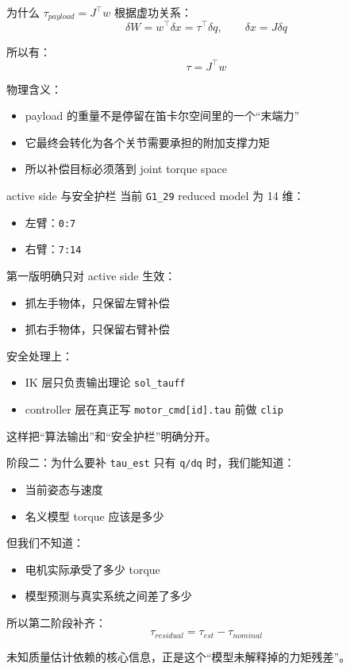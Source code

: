 \documentclass[aspectratio=169,11pt]{ctexbeamer}
\begin{document}
\begin{frame}{为什么 \texorpdfstring{$\tau_{payload}=J^\top w$}{tau=JTw}}
  根据虚功关系：
  \[
  \delta W=w^\top \delta x=\tau^\top \delta q,\qquad \delta x=J\delta q
  \]

  所以有：
  \[
  \tau=J^\top w
  \]

  物理含义：
  \begin{itemize}
    \item payload 的重量不是停留在笛卡尔空间里的一个“末端力”
    \item 它最终会转化为各个关节需要承担的附加支撑力矩
    \item 所以补偿目标必须落到 joint torque space
  \end{itemize}
\end{frame}

\begin{frame}{active side 与安全护栏}
  当前 \texttt{G1\_29} reduced model 为 14 维：
  \begin{itemize}
    \item 左臂：\texttt{0:7}
    \item 右臂：\texttt{7:14}
  \end{itemize}

  第一版明确只对 active side 生效：
  \begin{itemize}
    \item 抓左手物体，只保留左臂补偿
    \item 抓右手物体，只保留右臂补偿
  \end{itemize}

  \vspace{0.4em}
  安全处理上：
  \begin{itemize}
    \item IK 层只负责输出理论 \texttt{sol\_tauff}
    \item controller 层在真正写 \texttt{motor\_cmd[id].tau} 前做 \texttt{clip}
  \end{itemize}

  这样把“算法输出”和“安全护栏”明确分开。
\end{frame}

\begin{frame}{阶段二：为什么要补 \texttt{tau\_est}}
  只有 \texttt{q/dq} 时，我们能知道：
  \begin{itemize}
    \item 当前姿态与速度
    \item 名义模型 torque 应该是多少
  \end{itemize}

  但我们不知道：
  \begin{itemize}
    \item 电机实际承受了多少 torque
    \item 模型预测与真实系统之间差了多少
  \end{itemize}

  \vspace{0.4em}
  所以第二阶段补齐：
  \[
  \tau_{residual}=\tau_{est}-\tau_{nominal}
  \]

  未知质量估计依赖的核心信息，正是这个“模型未解释掉的力矩残差”。
\end{frame}
\end{document}
